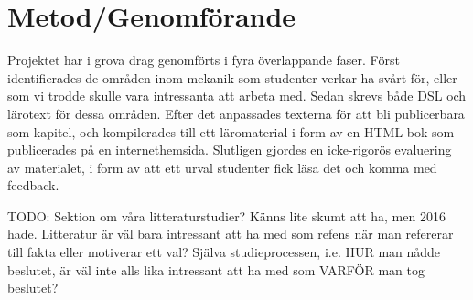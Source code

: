 



\chapter{Metod/Genomförande}

%


\begin{draft}

  Projektet har i grova drag genomförts i fyra överlappande
  faser. Först identifierades de områden inom mekanik som studenter
  verkar ha svårt för, eller som vi trodde skulle vara intressanta att
  arbeta med. Sedan skrevs både DSL och lärotext för dessa
  områden. Efter det anpassades texterna för att bli publicerbara som
  kapitel, och kompilerades till ett läromaterial i form av en
  HTML-bok som publicerades på en internethemsida. Slutligen gjordes
  en icke-rigorös evaluering av materialet, i form av att ett urval
  studenter fick läsa det och komma med feedback.

\end{draft}

TODO: Sektion om våra litteraturstudier? Känns lite skumt att ha,
men 2016 hade. Litteratur är väl bara intressant att ha med som
refens när man refererar till fakta eller motiverar ett val? Själva
studieprocessen, i.e. HUR man nådde beslutet, är väl inte alls lika
intressant att ha med som VARFÖR man tog beslutet?

